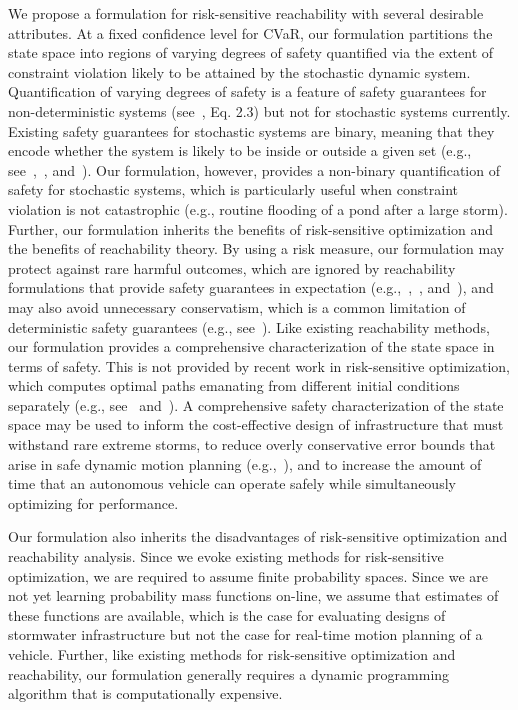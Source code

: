 \documentclass[letterpaper, 10 pt, conference]{ieeeconf}  %
\begin{document}
We propose a formulation for risk-sensitive reachability with several desirable attributes. 
At a fixed confidence level for CVaR, our formulation partitions the state space into regions of
varying degrees of safety quantified via the extent of constraint violation likely to be attained by the stochastic dynamic system.
Quantification of varying degrees of safety is a feature of safety guarantees for non-deterministic systems (see~\cite{EECS-2018-41}, Eq. 2.3) 
but not for stochastic systems currently. Existing safety guarantees for stochastic systems are binary, meaning that they encode whether the system is likely to be inside or outside a given set
(e.g., see~\cite{abate2008probabilistic},~\cite{summers2010verification}, and~\cite{kamgarpour2011discrete}).
Our formulation, however, provides a non-binary quantification of safety for stochastic systems,
which is particularly useful when constraint violation is not catastrophic (e.g., routine flooding of a pond after a large storm).
Further, our formulation inherits the benefits of risk-sensitive optimization and the benefits of reachability theory. 
By using a risk measure, our formulation may protect against rare harmful outcomes,
which are ignored by reachability formulations that provide safety guarantees in expectation (e.g.,~\cite{abate2008probabilistic},~\cite{summers2010verification}, and~\cite{kamgarpour2011discrete}),
and may also avoid unnecessary conservatism, which is a common limitation of deterministic safety guarantees (e.g., see~\cite{bansal2017hamilton}).
Like existing reachability methods, our formulation provides a comprehensive characterization of the state space in terms of safety.
This is not provided by recent work in risk-sensitive optimization, which computes optimal paths emanating from different initial conditions separately (e.g., see~\cite{chow2014framework} and~\cite{chow2015risk}).
A comprehensive safety characterization of the state space may be used 
to inform the cost-effective design of infrastructure that must withstand rare extreme storms,
to reduce overly conservative error bounds that arise in safe dynamic motion planning (e.g.,~\cite{herbert2017fastrack}), 
and to increase the amount of time that an autonomous vehicle can operate safely while simultaneously optimizing for performance.

Our formulation also inherits the disadvantages of risk-sensitive optimization and reachability analysis.
Since we evoke existing methods for risk-sensitive optimization, we are required to assume finite probability spaces.
Since we are not yet learning probability mass functions on-line, we assume that estimates of these functions are available, which is the case for evaluating designs of stormwater infrastructure
but not the case for real-time motion planning of a vehicle. Further, like existing methods for risk-sensitive optimization and reachability, 
our formulation generally requires a dynamic programming algorithm that is computationally expensive.
\end{document}
